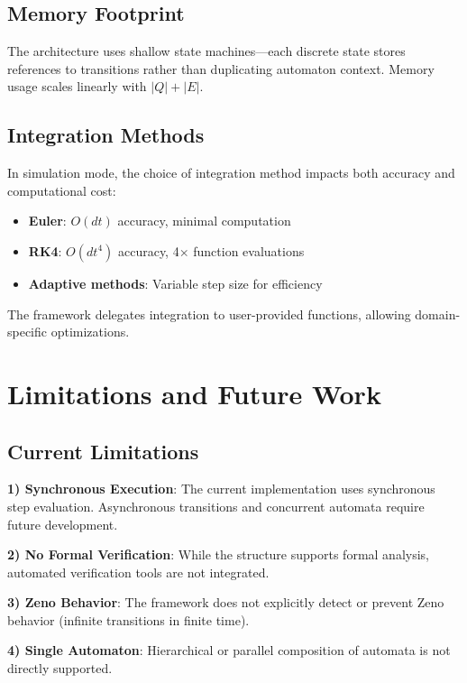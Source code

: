 \documentclass[conference]{IEEEtran}
\begin{document}
\subsection{Memory Footprint}

The architecture uses shallow state machines---each discrete state stores references to transitions rather than duplicating automaton context. Memory usage scales linearly with $|Q| + |E|$.

\subsection{Integration Methods}

In simulation mode, the choice of integration method impacts both accuracy and computational cost:

\begin{itemize}
\item \textbf{Euler}: $O(dt)$ accuracy, minimal computation
\item \textbf{RK4}: $O(dt^4)$ accuracy, 4$\times$ function evaluations
\item \textbf{Adaptive methods}: Variable step size for efficiency
\end{itemize}

The framework delegates integration to user-provided functions, allowing domain-specific optimizations.

\section{Limitations and Future Work}

\subsection{Current Limitations}

\textbf{1) Synchronous Execution}: The current implementation uses synchronous step evaluation. Asynchronous transitions and concurrent automata require future development.

\textbf{2) No Formal Verification}: While the structure supports formal analysis, automated verification tools are not integrated.

\textbf{3) Zeno Behavior}: The framework does not explicitly detect or prevent Zeno behavior (infinite transitions in finite time).

\textbf{4) Single Automaton}: Hierarchical or parallel composition of automata is not directly supported.
\end{document}
